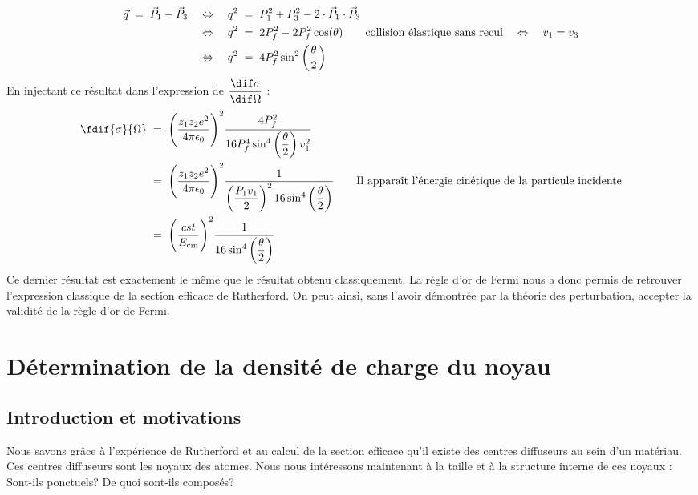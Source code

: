 \begin{align*}
    \vec{q} \; = \; \vec{P}_1 - \vec{P}_3
        &\quad \Leftrightarrow \quad
    q^2 \; = \; P_1^2 + P_3^2 - 2 \cdot \vec{P}_1 \cdot \vec{P}_3\\
        &\quad \Leftrightarrow \quad
    q^2 \; = \; 2 P_f^2 - 2 P_f^2 \cos(\theta)
    \qquad \text{collision élastique sans recul} \quad \Leftrightarrow \quad v_1=v_3\\
        &\quad \Leftrightarrow \quad
    q^2 \; = \; 4 P_f^2 \sin^2\left(\dfrac{\theta}{2}\right)
\end{align*}
En injectant ce résultat dans l'expression de  $\dfrac{\dif\sigma}{\dif\Omega}$ :
\begin{align*}
    \fdif{\sigma}{\Omega}
        &\eq
    \Bigg( \dfrac{z_1 z_2e^2}{4\pi\epsilon_0} \Bigg)^2 
    \dfrac{4 P_f^2}{16 P_f^4 \sin^4\left(\dfrac{\theta}{2}\right)v^2_1}\\
        &\eq
    \Bigg( \dfrac{z_1 z_2e^2}{4\pi\epsilon_0} \Bigg)^2
    \dfrac{1}{ \left(\dfrac{P_1v_1}{2}\right)^2 16\sin^4\left(\dfrac{\theta}{2}\right)}
    \qquad \text{Il apparaît l'énergie cinétique de la particule incidente}\\
    &\eq
    \Bigg( \dfrac{cst}{E_\text{cin}} \Bigg)^2
    \dfrac{1}{16\sin^4\left(\dfrac{\theta}{2}\right)}
\end{align*}
Ce dernier résultat est exactement le même que le résultat obtenu classiquement. La règle d'or de Fermi nous a donc permis de retrouver l'expression classique de la section efficace de Rutherford. On peut ainsi, sans l'avoir démontrée par la théorie des perturbation, accepter la validité de la règle d'or de Fermi.





\section{Détermination de la densité de charge du noyau}
\subsection{Introduction et motivations}

Nous savons grâce à l'expérience de Rutherford et au calcul de la section efficace qu'il existe des centres diffuseurs au sein d'un matériau. Ces centres diffuseurs sont les noyaux des atomes. Nous nous intéressons maintenant à la taille et à la structure interne de ces noyaux : Sont-ils ponctuels? De quoi sont-ils composés?

